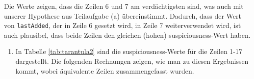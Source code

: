 \documentclass[12pt]{scrartcl}
\begin{document}
\begin{enumerate}[label=(\alph*)]
{        Die Werte zeigen, dass die Zeilen 6 und 7 am verdächtigsten sind, was auch mit unserer Hypothese aus Teilaufgabe (a) übereinstimmt.
        Dadurch, dass der Wert von \texttt{lastAdded}, der in Zeile 6 gesetzt wird, in Zeile 7 weiterverwendet wird, ist auch plausibel, dass beide Zeilen den gleichen (hohen) suspiciousness-Wert haben.
        }
\end{enumerate}

\begin{enumerate}[label=(\alph*)]
  \item {
        In Tabelle \ref{tab:tarantula2} sind die suspiciousness-Werte für die Zeilen 1-17 dargestellt.
        Die folgenden Rechnungen zeigen, wie man zu diesen Ergebnissen kommt, wobei äquivalente Zeilen zusammengefasst wurden.

}
\end{enumerate}
\end{document}
